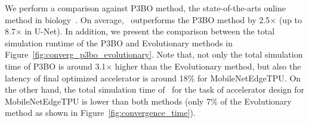 %
We perform a comparison against P3BO method, the state-of-the-arts online method in biology~\citep{p3bo:arxiv:2020}.
%
On average, \primemethodname\ outperforms the P3BO method by 2.5$\times$ (up to 8.7$\times$ in U-Net).
%
In addition, we present the comparison between the total simulation runtime of the P3BO and Evolutionary methods in Figure~\ref{fig:converg_p3bo_evolutionary}.
%
Note that, not only the total simulation time of P3BO is around 3.1$\times$ higher than the Evolutionary method, but also the latency of final optimized accelerator is around 18\% for MobileNetEdgeTPU.
%
On the other hand, the total simulation time of \primemethodname\ for the task of accelerator design for MobileNetEdgeTPU is lower than both methods (only 7\% of the Evolutionary method as shown in Figure~\ref{fig:convergence_time}).
%
\begin{table}[H]
\small
\centering
\vspace*{0.1cm}
\caption{Optimized objective values (i.e., latency in milliseconds) obtained by \primemethodname\ and P3BO~\citep{p3bo:arxiv:2020} when optimizing over single applications (MobileNetEdgeTPU, \mfour, t-RNN Dec, t-RNN Enc, and U-Net). On average, \primemethodname\ outperforms P3BO by 2.5$\times$.}
\label{table:p3bo_vs_prime}
\vspace{-0.1cm}
\end{table}
%
